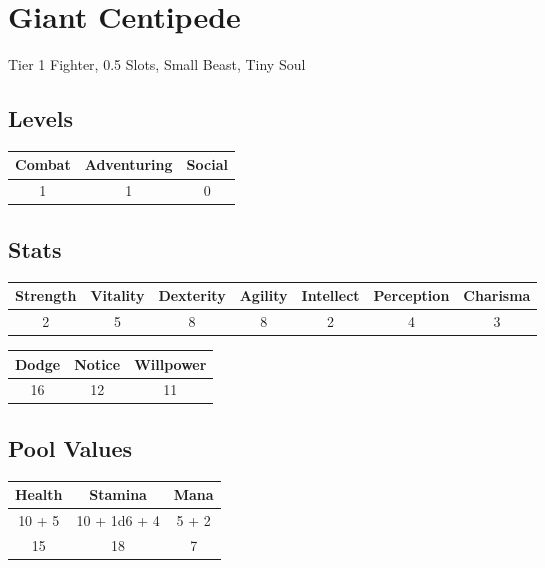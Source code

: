 \section{Giant Centipede}
Tier 1 Fighter, 0.5 Slots, Small Beast, Tiny Soul\\

\subsection{Levels}
\begin{minipage}[H]{1\textwidth}
	\centering
	\begin{tabular}[c]{|c | c | c|}
		\hline
		Combat & Adventuring & Social\\
		\hline
		1 & 1 & 0\\
		\hline
	\end{tabular}
\end{minipage}

\subsection{Stats}
\begin{minipage}[H]{1\textwidth}
	\centering
	\begin{tabular}[c]{|c | c | c | c | c | c | c|}
		\hline
		Strength & Vitality & Dexterity & Agility & Intellect & Perception & Charisma\\
		\hline
		2 & 5 & 8 & 8 & 2 & 4 & 3\\
		\hline
	\end{tabular}
\end{minipage}
\bigbreak

\begin{minipage}[H]{1\textwidth}
	\centering
	\begin{tabular}[c]{|c | c | c|}
		\hline
		Dodge & Notice & Willpower\\
		\hline
		16 & 12 & 11\\
		\hline
	\end{tabular}
\end{minipage}

\subsection{Pool Values}
\bigbreak
\begin{minipage}[H]{1\textwidth}
	\centering
	\begin{tabular}[c]{|c | c | c|}
		\hline
		Health & Stamina & Mana\\
		\hline
		10 + 5 & 10 + 1d6 + 4 & 5 + 2 \\
		15 & 18 & 7\\
		\hline
	\end{tabular}
\end{minipage}
\noindent

